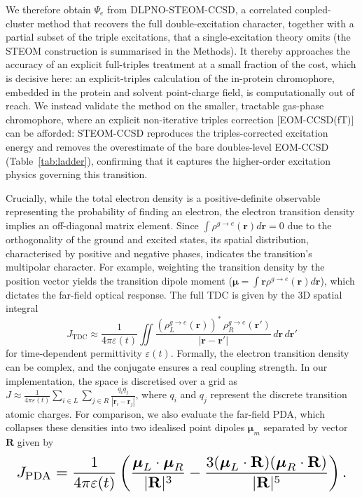 \documentclass[journal=jpcbfk, manuscript=article, layout=twocolumn, doi=true]{achemso}
\begin{document}
We therefore obtain $\Psi_e$ from DLPNO-STEOM-CCSD, a correlated coupled-cluster method that recovers the full double-excitation character, together with a partial subset of the triple excitations, that a single-excitation theory omits (the STEOM construction is summarised in the Methods). It thereby approaches the accuracy of an explicit full-triples treatment at a small fraction of the cost, which is decisive here: an explicit-triples calculation of the in-protein chromophore, embedded in the protein and solvent point-charge field, is computationally out of reach. We instead validate the method on the smaller, tractable gas-phase chromophore, where an explicit non-iterative triples correction [EOM-CCSD(fT)] can be afforded: STEOM-CCSD reproduces the triples-corrected excitation energy and removes the overestimate of the bare doubles-level EOM-CCSD (Table~\ref{tab:ladder}), confirming that it captures the higher-order excitation physics governing this transition.

Crucially, while the total electron density is a positive-definite observable representing the probability of finding an electron, the electron transition density implies an off-diagonal matrix element. Since $\int \rho^{g\to e}(\mathbf{r}) d\mathbf{r} = 0$ due to the orthogonality of the ground and excited states, its spatial distribution, characterised by positive and negative phases, indicates the transition's multipolar character. For example, weighting the transition density by the position vector yields the transition dipole moment ($\boldsymbol{\mu} = \int \mathbf{r} \rho^{g \to e}(\mathbf{r}) d\mathbf{r}$), which dictates the far-field optical response. The full TDC is given by the 3D spatial integral
\begin{equation}
    J_{\mathrm{TDC}} \approx \frac{1}{4\pi\varepsilon(t)}\iint \frac{\left(\rho^{g\to e}_L(\mathbf r)\right)^*\,\rho^{g\to e}_R(\mathbf r')}{|\mathbf r-\mathbf r'|} \,d\mathbf r\,d\mathbf r'
    \label{eq:J_integral}
\end{equation}
for time-dependent permittivity $\varepsilon(t)$.
Formally, the electron transition density can be complex, and the conjugate ensures a real coupling strength. In our implementation, the space is discretised over a grid as $J \approx\frac{1}{4\pi\varepsilon(t)}\sum_{i\in L}\sum_{j\in R}\frac{q_i q_j}{|\mathbf r_i-\mathbf r_j|}$, where $q_i$ and $q_j$ represent the discrete transition atomic charges. For comparison, we also evaluate the far-field PDA, which collapses these densities into two idealised point dipoles $\boldsymbol{\mu}_m$ separated by vector $\mathbf{R}$ given by
\begin{equation} \label{eq:J_PD}
    \resizebox{.98\columnwidth}{!}{$\displaystyle
    J_{\mathrm{PDA}} = \frac{1}{4\pi\varepsilon(t)} \left( \frac{\boldsymbol{\mu}_L \cdot \boldsymbol{\mu}_R}{|\mathbf{R}|^3} - \frac{3(\boldsymbol{\mu}_L \cdot \mathbf{R})(\boldsymbol{\mu}_R \cdot \mathbf{R})}{|\mathbf{R}|^5} \right).$}
\end{equation}
\end{document}

